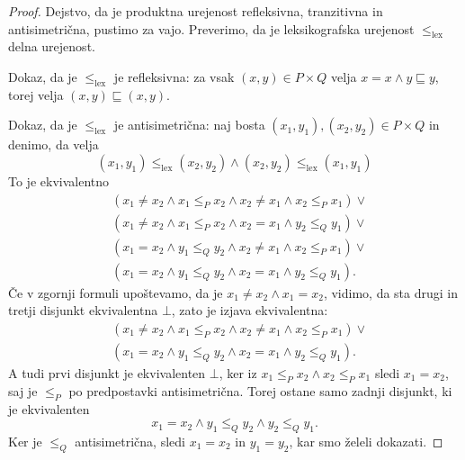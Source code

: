 \begin{proof}
  Dejstvo, da je produktna urejenost refleksivna, tranzitivna in antisimetrična, pustimo za vajo. Preverimo, da je leksikografska urejenost $\leq_\mathrm{lex}$ delna urejenost.

  Dokaz, da je $\leq_\mathrm{lex}$ je refleksivna: za vsak $(x, y) \in P \times Q$ velja $x = x \land y \sqsubseteq y$, torej velja $(x, y) \sqsubseteq (x, y)$.

  Dokaz, da je $\leq_\mathrm{lex}$ je antisimetrična: naj bosta $(x_1,y_1), (x_2,y_2) \in P \times Q$ in denimo, da velja
  \begin{equation*}
    (x_1, y_1) \leq_\mathrm{lex} (x_2, y_2) \land (x_2, y_2) \leq_\mathrm{lex} (x_1, y_1)
  \end{equation*}
  To je ekvivalentno
  \begin{align*}
  & (x_1 \neq x_2 \land x_1 \leq_P x_2 \land x_2 \neq x_1 \land x_2 \leq_P x_1) \lor {}\\
  & (x_1 \neq x_2 \land x_1 \leq_P x_2 \land x_2 = x_1 \land y_2 \leq_Q y_1) \lor {}\\
  & (x_1 = x_2 \land y_1 \leq_Q y_2 \land x_2 \neq x_1 \land x_2 \leq_P x_1) \lor {}\\
  & (x_1 = x_2 \land y_1 \leq_Q y_2 \land x_2 = x_1 \land y_2 \leq_Q y_1).
  \end{align*}
  Če v zgornji formuli upoštevamo, da je $x_1 \neq x_2 \land x_1 = x_2$, vidimo, da sta drugi in tretji disjunkt ekvivalentna $\bot$, zato
  je izjava ekvivalentna:
  \begin{align*}
  &(x_1 \neq x_2 \land x_1 \leq_P x_2 \land x_2 \neq x_1 \land x_2 \leq_P x_1) \lor {}\\
  &(x_1 = x_2 \land y_1 \leq_Q y_2 \land x_2 = x_1 \land y_2 \leq_Q y_1).
  \end{align*}
  A tudi prvi disjunkt je ekvivalenten $\bot$, ker iz $x_1 \leq_P x_2 \land x_2 \leq_P x_1$ sledi $x_1 = x_2$, saj je $\leq_P$ po predpostavki antisimetrična. Torej ostane samo zadnji disjunkt, ki je ekvivalenten
  \begin{equation*}
    x_1 = x_2 \land y_1 \leq_Q y_2 \land y_2 \leq_Q y_1.
  \end{equation*}
  Ker je $\leq_Q$ antisimetrična, sledi $x_1 = x_2$ in $y_1 = y_2$, kar smo želeli dokazati.


\end{proof}
